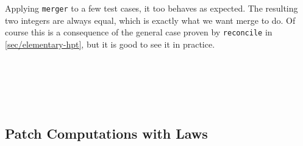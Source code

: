Applying \texttt{merger} to a few test cases, it too behaves as expected.
The resulting two integers are always equal, which is exactly what we want merge to do.
Of course this is a consequence of the general case proven by \texttt{reconcile} in
\autoref{sec/elementary-hpt}, but it is good to see it in practice.
\begin{code}%
%
\>[2]\AgdaFunction{\AgdaUnderscore{}}\AgdaSpace{}%
\AgdaSymbol{:}\AgdaSpace{}%
\AgdaSpace{}%
\AgdaSpace{}%
\AgdaSpace{}%
\AgdaSpace{}%
\AgdaSpace{}%
\AgdaSymbol{(}\AgdaSpace{}%
\AgdaOperator{\AgdaInductiveConstructor{,}}\AgdaSpace{}%
\AgdaSymbol{)}\<%
\\
%
\>[2]\AgdaSymbol{\AgdaUnderscore{}}\AgdaSpace{}%
\AgdaSymbol{=}\AgdaSpace{}%
\<%
\\
%
\\[\AgdaEmptyExtraSkip]%
%
\>[2]\AgdaFunction{\AgdaUnderscore{}}\AgdaSpace{}%
\AgdaSymbol{:}\AgdaSpace{}%
\AgdaSpace{}%
\AgdaSpace{}%
\AgdaSymbol{(}\AgdaSpace{}%
\AgdaSymbol{)}\AgdaSpace{}%
\AgdaSymbol{(}\AgdaSpace{}%
\AgdaSymbol{(}\AgdaSymbol{))}\AgdaSpace{}%
\AgdaSpace{}%
\AgdaSymbol{(}\AgdaSpace{}%
\AgdaOperator{\AgdaInductiveConstructor{,}}\AgdaSpace{}%
\AgdaSymbol{)}\<%
\\
%
\>[2]\AgdaSymbol{\AgdaUnderscore{}}\AgdaSpace{}%
\AgdaSymbol{=}\AgdaSpace{}%
\<%
\end{code}

\subsection{Patch Computations with Laws}

